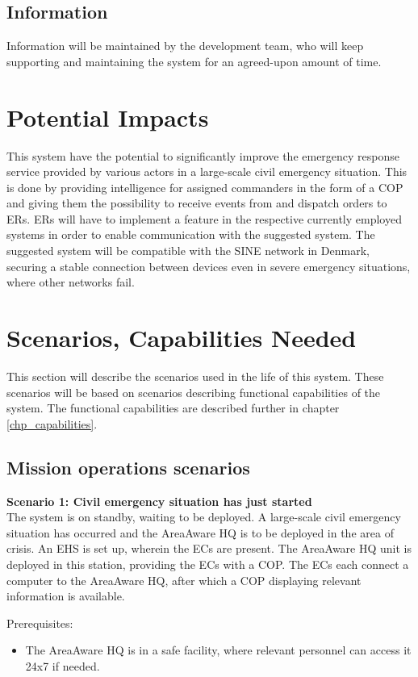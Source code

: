 \subsection{Information}
Information will be maintained by the development team, who will keep supporting and maintaining the system for an agreed-upon amount of time.


\section{Potential Impacts}
This system have the potential to significantly improve the emergency response service provided by various actors in a large-scale civil emergency situation. This is done by providing intelligence for assigned commanders in the form of a COP and giving them the possibility to receive events from and dispatch orders to ERs. ERs will have to implement a feature in the respective currently employed systems in order to enable communication with the suggested system. 
The suggested system will be compatible with the SINE network in Denmark, securing a stable connection between devices even in severe emergency situations, where other networks fail.


\newpage
\section{Scenarios, Capabilities Needed}
\label{sec_scenarios}
This section will describe the scenarios used	in the life of this system. These scenarios will be based on scenarios describing functional capabilities of the system. The functional capabilities are described further in chapter \ref{chp_capabilities}.

\subsection{Mission operations scenarios}
\noindent \textbf{Scenario 1: Civil emergency situation has just started} \\
The system is on standby, waiting to be deployed. 
A large-scale civil emergency situation has occurred and the AreaAware HQ is to be deployed in the area of crisis. An EHS is set up, wherein the ECs are present. The AreaAware HQ unit is deployed in this station, providing the ECs with a COP. The ECs each connect a computer to the AreaAware HQ, after which a COP displaying relevant information is available.

\noindent Prerequisites:
\begin{itemize}
	\item The AreaAware HQ is in a safe facility, where relevant personnel can access it 24x7 if needed.
\end{itemize}

